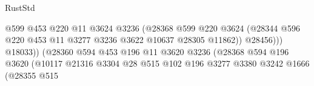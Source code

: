 \begin{lexlean}{RustStd}
\begin{coremodule}
                                                    @599
                                                    @453
                                                    @220
                                                    @11
                                                    @3624
                                                    @3236
                                                    (@28368
                                                      @599
                                                      @220
                                                      @3624
                                                      (@28344
                                                        @596
                                                        @220
                                                        @453
                                                        @11
                                                        @3277
                                                        @3236
                                                        @3622
                                                        @10637
                                                        @28305
                                                        @11862))
                                                    @28456)))
                                              @18033))
                                          (@28360
                                            @594
                                            @453
                                            @196
                                            @11
                                            @3620
                                            @3236
                                            (@28368
                                              @594
                                              @196
                                              @3620
                                              (@10117
                                                @21316
                                                @3304
                                                @28
                                                @515
                                                @102
                                                @196
                                                @3277
                                                @3380
                                                @3242
                                                @1666
                                                (@28355
                                                  @515

\end{coremodule}
\end{lexlean}
